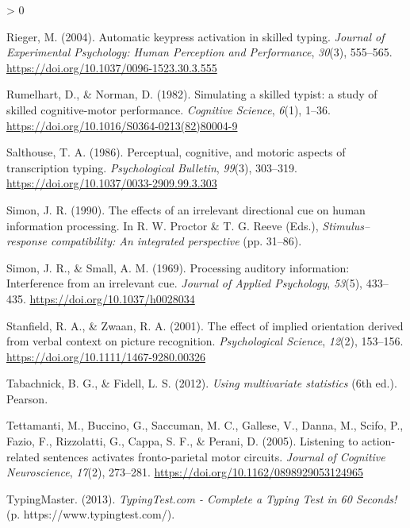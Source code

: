\documentclass[
  english,
  man,mask]{apa7}
\newlength{\cslhangindent}
\newenvironment{CSLReferences}[2] %
 {%
  \setlength{\parindent}{0pt}
  \ifodd #1 \everypar{\setlength{\hangindent}{\cslhangindent}}\ignorespaces\fi
  \ifnum #2 > 0
  \setlength{\parskip}{#2\baselineskip}
  \fi
 }%
 {}
\begin{document}
\begin{CSLReferences}{1}{0}
\leavevmode\hypertarget{ref-Rieger2004}{}%
Rieger, M. (2004). {Automatic keypress activation in skilled typing}. \emph{Journal of Experimental Psychology: Human Perception and Performance}, \emph{30}(3), 555--565. \url{https://doi.org/10.1037/0096-1523.30.3.555}

\leavevmode\hypertarget{ref-Rumelhart1982}{}%
Rumelhart, D., \& Norman, D. (1982). {Simulating a skilled typist: a study of skilled cognitive-motor performance}. \emph{Cognitive Science}, \emph{6}(1), 1--36. \url{https://doi.org/10.1016/S0364-0213(82)80004-9}

\leavevmode\hypertarget{ref-Salthouse1986}{}%
Salthouse, T. A. (1986). {Perceptual, cognitive, and motoric aspects of transcription typing}. \emph{Psychological Bulletin}, \emph{99}(3), 303--319. \url{https://doi.org/10.1037/0033-2909.99.3.303}

\leavevmode\hypertarget{ref-Simon1990}{}%
Simon, J. R. (1990). {The effects of an irrelevant directional cue on human information processing}. In R. W. Proctor \& T. G. Reeve (Eds.), \emph{Stimulus--response compatibility: An integrated perspective} (pp. 31--86).

\leavevmode\hypertarget{ref-Simon1969}{}%
Simon, J. R., \& Small, A. M. (1969). {Processing auditory information: Interference from an irrelevant cue}. \emph{Journal of Applied Psychology}, \emph{53}(5), 433--435. \url{https://doi.org/10.1037/h0028034}

\leavevmode\hypertarget{ref-Stanfield2001}{}%
Stanfield, R. A., \& Zwaan, R. A. (2001). {The effect of implied orientation derived from verbal context on picture recognition}. \emph{Psychological Science}, \emph{12}(2), 153--156. \url{https://doi.org/10.1111/1467-9280.00326}

\leavevmode\hypertarget{ref-Tabachnick2012}{}%
Tabachnick, B. G., \& Fidell, L. S. (2012). \emph{{Using multivariate statistics}} (6th ed.). Pearson.

\leavevmode\hypertarget{ref-Tettamanti2005}{}%
Tettamanti, M., Buccino, G., Saccuman, M. C., Gallese, V., Danna, M., Scifo, P., Fazio, F., Rizzolatti, G., Cappa, S. F., \& Perani, D. (2005). {Listening to action-related sentences activates fronto-parietal motor circuits}. \emph{Journal of Cognitive Neuroscience}, \emph{17}(2), 273--281. \url{https://doi.org/10.1162/0898929053124965}

\leavevmode\hypertarget{ref-Inc2013}{}%
TypingMaster. (2013). \emph{{TypingTest.com - Complete a Typing Test in 60 Seconds!}} (p. https://www.typingtest.com/).


\end{CSLReferences}
\end{document}
